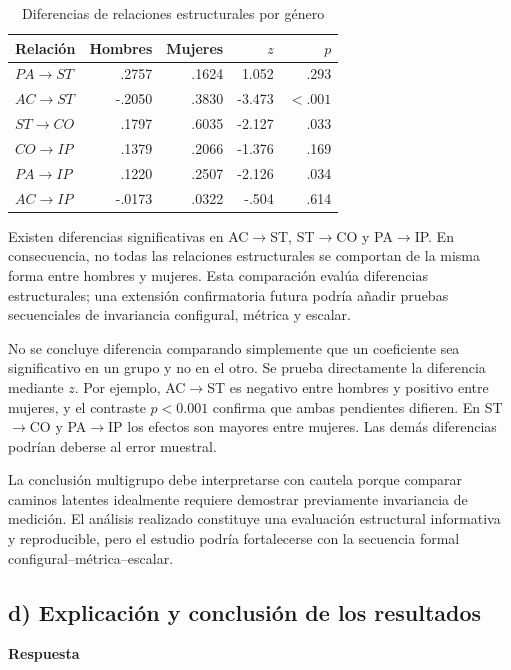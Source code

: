\documentclass[11pt,letterpaper]{article}
\begin{document}
\begin{table}[H]
\centering
\caption{Diferencias de relaciones estructurales por género}
\begin{tabular}{lrrrr}
\toprule
Relación & Hombres & Mujeres & $z$ & $p$\\
\midrule
$PA\rightarrow ST$ & .2757 & .1624 & 1.052 & .293\\
$AC\rightarrow ST$ & -.2050 & .3830 & -3.473 & $<.001$\\
$ST\rightarrow CO$ & .1797 & .6035 & -2.127 & .033\\
$CO\rightarrow IP$ & .1379 & .2066 & -1.376 & .169\\
$PA\rightarrow IP$ & .1220 & .2507 & -2.126 & .034\\
$AC\rightarrow IP$ & -.0173 & .0322 & -.504 & .614\\
\bottomrule
\end{tabular}
\end{table}

Existen diferencias significativas en AC$\rightarrow$ST, ST$\rightarrow$CO y PA$\rightarrow$IP. En consecuencia, no todas las relaciones estructurales se comportan de la misma forma entre hombres y mujeres. Esta comparación evalúa diferencias estructurales; una extensión confirmatoria futura podría añadir pruebas secuenciales de invariancia configural, métrica y escalar.

No se concluye diferencia comparando simplemente que un coeficiente sea significativo en un grupo y no en el otro. Se prueba directamente la diferencia mediante $z$. Por ejemplo, AC$\rightarrow$ST es negativo entre hombres y positivo entre mujeres, y el contraste $p<0.001$ confirma que ambas pendientes difieren. En ST$\rightarrow$CO y PA$\rightarrow$IP los efectos son mayores entre mujeres. Las demás diferencias podrían deberse al error muestral.

La conclusión multigrupo debe interpretarse con cautela porque comparar caminos latentes idealmente requiere demostrar previamente invariancia de medición. El análisis realizado constituye una evaluación estructural informativa y reproducible, pero el estudio podría fortalecerse con la secuencia formal configural--métrica--escalar.

\subsection{d) Explicación y conclusión de los resultados}

\textbf{Respuesta}
\end{document}

